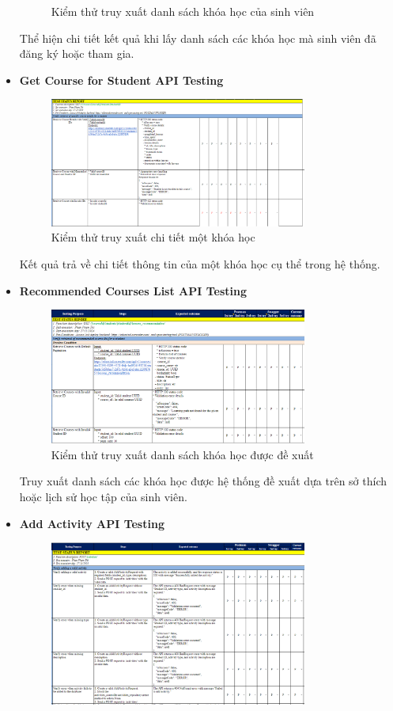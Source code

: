 \begin{itemize}
\begin{figure}[H]
        \caption{Kiểm thử truy xuất danh sách khóa học của sinh viên}
    \end{figure}
    Thể hiện chi tiết kết quả khi lấy danh sách các khóa học mà sinh viên đã đăng ký hoặc tham gia.
    \item \textbf{Get Course for Student API Testing}
    \begin{figure}[H]
        \centering
        \includegraphics[width=0.8\textwidth]{Images/test/test_CD.png}
        \caption{Kiểm thử truy xuất chi tiết một khóa học}
    \end{figure}
    Kết quả trả về chi tiết thông tin của một khóa học cụ thể trong hệ thống.
    \item \textbf{Recommended Courses List API Testing}
    \begin{figure}[H]
        \centering
        \includegraphics[width=0.8\textwidth]{Images/test/test_RCL.png}
        \caption{Kiểm thử truy xuất danh sách khóa học được đề xuất}
    \end{figure}
    Truy xuất danh sách các khóa học được hệ thống đề xuất dựa trên sở thích hoặc lịch sử học tập của sinh viên.
    \item \textbf{Add Activity API Testing}
    \begin{figure}[H]
        \centering
        \includegraphics[width=0.8\textwidth]{Images/test/test_AA.png}

\end{figure}
\end{itemize}
